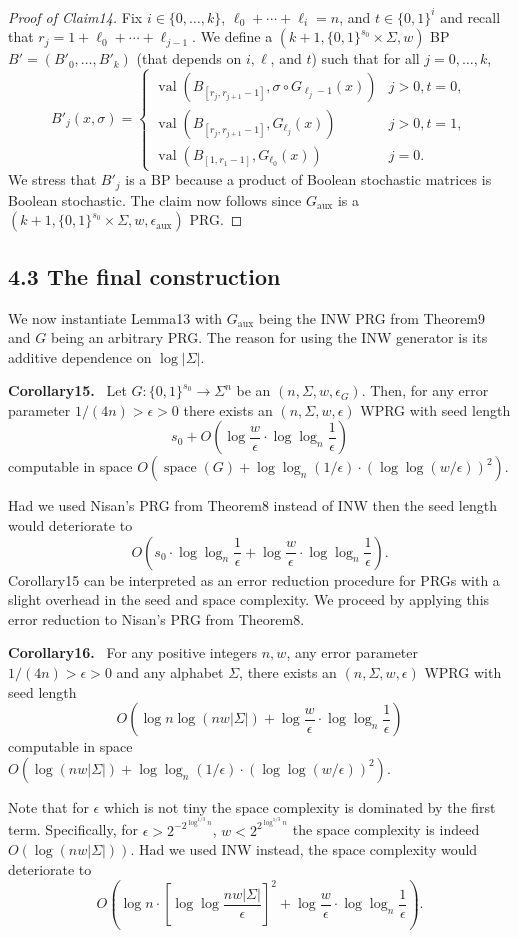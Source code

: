 \documentclass[10pt,a4paper]{article}
\newenvironment{authorclaim}[1]{\par\medskip\noindent\textbf{#1.}\ }{\par\medskip}
\begin{document}
\begin{proof}[Proof of Claim14]
Fix $i\in\{0,\ldots,k\}$, $\ell_0+\cdots+\ell_i=n$, and $t\in\{0,1\}^i$ and recall that $r_j=1+\ell_0+\cdots+\ell_{j-1}$. We define a $(k+1,\{0,1\}^{s_0}\times\Sigma,w)$ BP $B'=(B'_0,\ldots,B'_k)$ (that depends on $i,\ell$, and $t$) such that for all $j=0,\ldots,k$,
\begin{equation}\tag{12}B'_j(x,\sigma)=\begin{cases}\operatorname{val}(B_{[r_j,r_{j+1}-1]},\sigma\circ G_{\ell_j-1}(x))&j>0,t=0,\\\operatorname{val}(B_{[r_j,r_{j+1}-1]},G_{\ell_j}(x))&j>0,t=1,\\\operatorname{val}(B_{[1,r_1-1]},G_{\ell_0}(x))&j=0.\end{cases}\end{equation}
We stress that $B'_j$ is a BP because a product of Boolean stochastic matrices is Boolean stochastic. The claim now follows since $G_{\mathrm{aux}}$ is a $(k+1,\{0,1\}^{s_0}\times\Sigma,w,\epsilon_{\mathrm{aux}})$ PRG.
\end{proof}
\subsection*{4.3 The final construction}
We now instantiate Lemma13 with $G_{\mathrm{aux}}$ being the INW PRG from Theorem9 and $G$ being an arbitrary PRG. The reason for using the INW generator is its additive dependence on $\log|\Sigma|$.
\begin{authorclaim}{Corollary15}
Let $G:\{0,1\}^{s_0}\to\Sigma^n$ be an $(n,\Sigma,w,\epsilon_G)$. Then, for any error parameter $1/(4n)>\epsilon>0$ there exists an $(n,\Sigma,w,\epsilon)$ WPRG with seed length
\[s_0+O\left(\log\frac w\epsilon\cdot\log\log_n\frac1\epsilon\right)\]
computable in space $O(\operatorname{space}(G)+\log\log_n(1/\epsilon)\cdot(\log\log(w/\epsilon))^2)$.
\end{authorclaim}
Had we used Nisan's PRG from Theorem8 instead of INW then the seed length would deteriorate to
\[O\left(s_0\cdot\log\log_n\frac1\epsilon+\log\frac w\epsilon\cdot\log\log_n\frac1\epsilon\right).\]
Corollary15 can be interpreted as an error reduction procedure for PRGs with a slight overhead in the seed and space complexity. We proceed by applying this error reduction to Nisan's PRG from Theorem8.
\begin{authorclaim}{Corollary16}
For any positive integers $n,w$, any error parameter $1/(4n)>\epsilon>0$ and any alphabet $\Sigma$, there exists an $(n,\Sigma,w,\epsilon)$ WPRG with seed length
\[O\left(\log n\log(nw|\Sigma|)+\log\frac w\epsilon\cdot\log\log_n\frac1\epsilon\right)\]
computable in space $O(\log(nw|\Sigma|)+\log\log_n(1/\epsilon)\cdot(\log\log(w/\epsilon))^2)$.
\end{authorclaim}
Note that for $\epsilon$ which is not tiny the space complexity is dominated by the first term. Specifically, for $\epsilon>2^{-2^{\log^{1/3}n}}$, $w<2^{2^{\log^{1/3}n}}$ the space complexity is indeed $O(\log(nw|\Sigma|))$. Had we used INW instead, the space complexity would deteriorate to
\[O\left(\log n\cdot\left[\log\log\frac{nw|\Sigma|}\epsilon\right]^2+\log\frac w\epsilon\cdot\log\log_n\frac1\epsilon\right).\]
\end{document}
